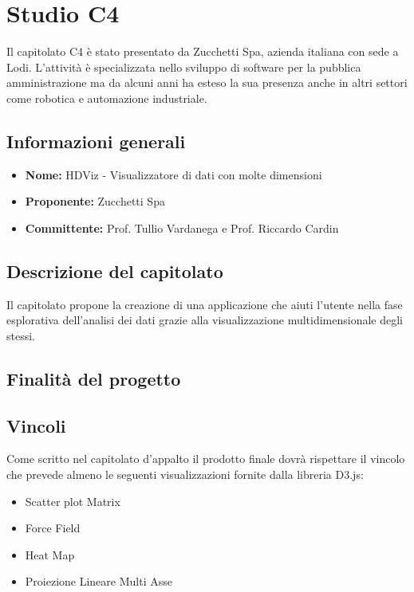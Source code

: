 \section{Studio C4}
Il capitolato C4 è stato presentato da Zucchetti Spa, azienda italiana con sede a Lodi. L'attività è specializzata nello sviluppo di software per la pubblica amministrazione ma da alcuni anni ha esteso la sua presenza anche in altri settori come robotica e automazione industriale.

\subsection{Informazioni generali}
\begin{itemize}
    \item \textbf{Nome:} HDViz - Visualizzatore di dati con molte dimensioni
    \item \textbf{Proponente:} Zucchetti Spa
    \item \textbf{Committente:} Prof. Tullio Vardanega e Prof. Riccardo Cardin
\end{itemize}

\subsection{Descrizione del capitolato}
Il capitolato propone la creazione di una applicazione che aiuti l'utente nella fase esplorativa dell'analisi dei dati grazie alla visualizzazione multidimensionale degli stessi.

\subsection{Finalità del progetto}


\subsection{Vincoli}
Come scritto nel capitolato d'appalto il prodotto finale dovrà rispettare il vincolo che prevede almeno le seguenti visualizzazioni fornite dalla libreria D3.js:

\begin{itemize}
    \item Scatter plot Matrix
    \item Force Field
    \item Heat Map
    \item Proiezione Lineare Multi Asse
\end{itemize}

